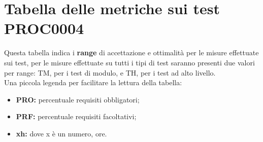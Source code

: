 \documentclass[PianoDiQualifica.tex]{subfiles}
\begin{document}
\begin{table}[H]
\begin{center}
\begin{tabu}
				
		\end{tabu}
		\caption{Tabella delle metriche della qualità di processo}
		\vspace{-1em}
	\end{center}
\end{table}

\section{Tabella delle metriche sui test PROC0004}
Questa tabella indica i \textbf{range} di accettazione e ottimalità per le misure effettuate sui test, per le misure effettuate su tutti i tipi di test saranno presenti due valori per range: TM, per i test di modulo, e TH, per i test ad alto livello.\\
Una piccola legenda per facilitare la lettura della tabella: \\
\begin{itemize}
	\item \textbf{PRO:} percentuale requisiti obbligatori;
	\item \textbf{PRF:} percentuale requisiti facoltativi;
	\item \textbf{xh:} dove x è un numero, ore.
\end{itemize}
\end{document}
